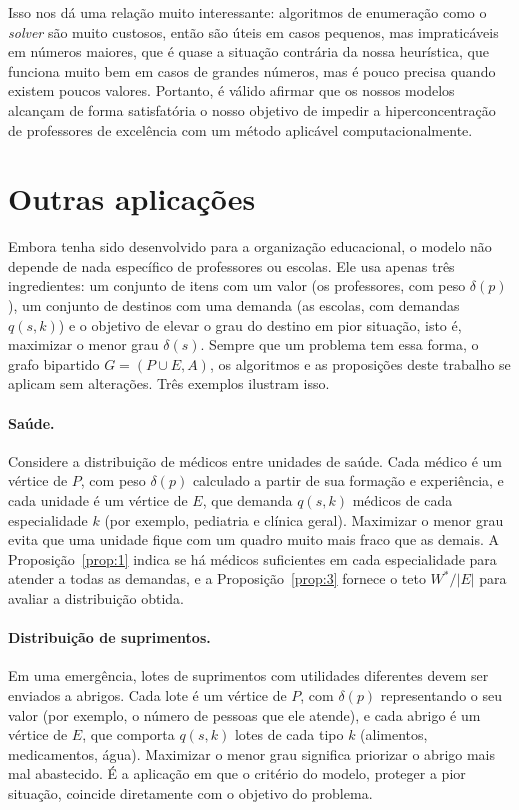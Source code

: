 \documentclass[12pt,a4paper]{article}
\begin{document}
Isso nos dá uma relação muito interessante: algoritmos de enumeração como o \emph{solver} são muito custosos, então são úteis em casos pequenos, mas impraticáveis em números maiores, que é quase a situação contrária da nossa heurística, que funciona muito bem em casos de grandes números, mas é pouco precisa quando existem poucos valores. Portanto, é válido afirmar que os nossos modelos alcançam de forma satisfatória o nosso objetivo de impedir a hiperconcentração de professores de excelência com um método aplicável computacionalmente.


\section{Outras aplicações}

Embora tenha sido desenvolvido para a organização educacional, o modelo não depende de nada específico de professores ou escolas. Ele usa apenas três ingredientes: um conjunto de itens com um valor (os professores, com peso $\delta(p)$), um conjunto de destinos com uma demanda (as escolas, com demandas $q(s,k)$) e o objetivo de elevar o grau do destino em pior situação, isto é, maximizar o menor grau $\delta(s)$. Sempre que um problema tem essa forma, o grafo bipartido $G = (P \cup E, A)$, os algoritmos e as proposições deste trabalho se aplicam sem alterações. Três exemplos ilustram isso.

\paragraph{Saúde.} Considere a distribuição de médicos entre unidades de saúde. Cada médico é um vértice de $P$, com peso $\delta(p)$ calculado a partir de sua formação e experiência, e cada unidade é um vértice de $E$, que demanda $q(s,k)$ médicos de cada especialidade $k$ (por exemplo, pediatria e clínica geral). Maximizar o menor grau evita que uma unidade fique com um quadro muito mais fraco que as demais. A Proposição~\ref{prop:1} indica se há médicos suficientes em cada especialidade para atender a todas as demandas, e a Proposição~\ref{prop:3} fornece o teto $W^*/|E|$ para avaliar a distribuição obtida.

\paragraph{Distribuição de suprimentos.} Em uma emergência, lotes de suprimentos com utilidades diferentes devem ser enviados a abrigos. Cada lote é um vértice de $P$, com $\delta(p)$ representando o seu valor (por exemplo, o número de pessoas que ele atende), e cada abrigo é um vértice de $E$, que comporta $q(s,k)$ lotes de cada tipo $k$ (alimentos, medicamentos, água). Maximizar o menor grau significa priorizar o abrigo mais mal abastecido. É a aplicação em que o critério do modelo, proteger a pior situação, coincide diretamente com o objetivo do problema.
\end{document}
